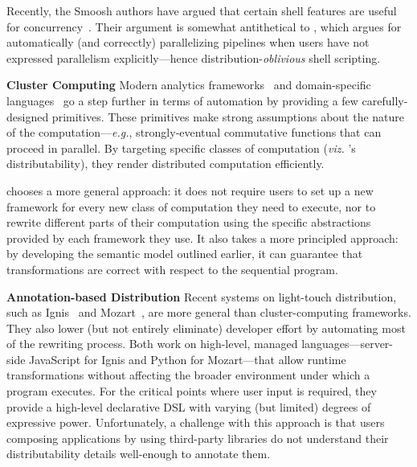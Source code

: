 \documentclass[sigplan,10pt,review,anonymous]{acmart}
\newcommand{\eg}{{\em e.g.}, }
\newcommand{\heading}[1]{\vspace{4pt}\noindent\textbf{#1}\enspace}
\begin{document}
Recently, the Smoosh authors have argued that certain shell features are useful for concurrency~\cite{smoosh:18}.
Their argument is somewhat antithetical to \sys, %
  which argues for automatically (and correcctly) parallelizing pipelines when users have not expressed parallelism explicitly---hence distribution-\emph{oblivious} shell scripting.


\heading{Cluster Computing}
Modern analytics frameworks~\cite{mapreduce:08, ciel:11, spark:12, naiad:13} and domain-specific languages~\cite{alvaro2011consistency, distal:13, meiklejohn2015lasp} go a step further in terms of automation by providing a few carefully-designed primitives.
These primitives make strong assumptions about the nature of the computation---\eg strongly-eventual commutative functions that can proceed in parallel.
By targeting specific classes of computation (\emph{viz.} \sys's distributability), they render distributed computation efficiently.

\sys chooses a more general approach:
  it does not require users to set up a new framework for every new class of computation they need to execute, nor to rewrite different parts of their computation using the specific abstractions provided by each framework they use.
It also takes a more principled approach: by developing the semantic model outlined earlier, it can guarantee that transformations are correct with respect to the sequential program.



\heading{Annotation-based Distribution}
Recent systems on light-touch distribution, such as Ignis~\cite{ignis:19} and Mozart~\cite{mozart:19}, are more general than cluster-computing frameworks.
They also lower (but not entirely eliminate) developer effort by automating most of the rewriting process.
Both work on high-level, managed languages---server-side JavaScript for Ignis and Python for Mozart---that allow runtime transformations without affecting the broader environment under which a program executes.
For the critical points where user input is required, they provide a high-level declarative DSL with varying (but limited) degrees of expressive power.
Unfortunately, a challenge with this approach is that users composing applications by using third-party libraries do not understand their distributability details well-enough to annotate them.
\end{document}
